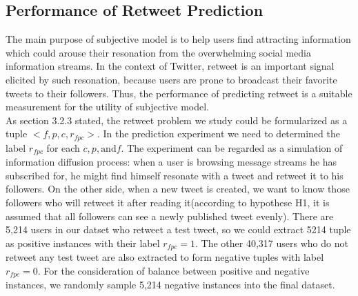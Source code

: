 \documentclass{acm_proc_article-sp}
\begin{document}
\subsection{Performance of Retweet Prediction }
The main purpose of subjective model is to help users find attracting information which could arouse their resonation from the overwhelming social media information streams. 
In the context of Twitter, retweet is an important signal elicited by such resonation, because users are prone to broadcast their favorite tweets to their followers. 
Thus, the performance of predicting retweet is a suitable measurement for the utility of subjective model.\\
As section 3.2.3 stated, the retweet problem we study could be formularized as a tuple $< f, p, c, r_{fpc}> $.
In the prediction experiment we need to determined the label $ r_{fpc} $ for each $ c, p, \text{and} f $. 
The experiment can be regarded as a simulation of information diffusion process: when a user is browsing message streams he has subscribed for, he might find himself resonate with a tweet and retweet it to his followers.
On the other side, when a new tweet is created, we want to know those followers who will retweet it after reading it(according to hypothese H1, it is assumed that all followers can see a newly published tweet evenly). 
There are 5,214 users in our datset who retweet a test tweet, so we could extract 5214 tuple as positive instances with their label $ r_{fpc}=1 $.
The other 40,317 users who do not retweet any test tweet are also extracted to form negative tuples with label $ r_{fpc}=0 $.
For the consideration of balance between positive and negative instances, we randomly sample 5,214 negative instances into the final dataset.\\
\end{document}
